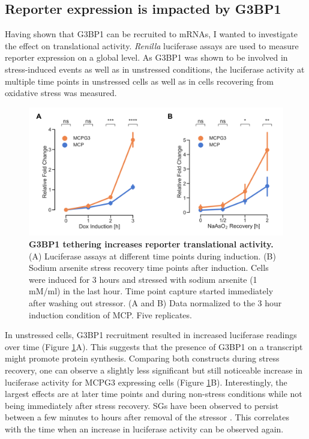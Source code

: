 \subsection{Reporter expression is impacted by G3BP1} \label{mcp_luciferase}

Having shown that G3BP1 can be recruited to mRNAs, I wanted to investigate the effect on translational activity. \textit{Renilla} luciferase assays are used to measure reporter expression on a global level.
As G3BP1 was shown to be involved in stress-induced events as well as in unstressed conditions, the luciferase activity at multiple time points in unstressed cells as well as in cells recovering from oxidative stress was measured.

\begin{figure}[t!]
    \centering
    \includegraphics[width=\linewidth]{images/figure3}
    \caption{\textbf{G3BP1 tethering increases reporter translational activity.}
        (A) Luciferase assays at different time points during induction.
        (B) Sodium arsenite stress recovery time points after induction.
            Cells were induced for 3 hours and stressed with sodium arsenite (1 mM/ml) in the last hour.
            Time point capture started immediately after washing out stressor.
        (A and B) Data normalized to the 3 hour induction condition of MCP. Five replicates.   
    }
    \label{fig:mcp_luciferase}
\end{figure}

In unstressed cells, G3BP1 recruitment resulted in increased luciferase readings over time (Figure \ref{fig:mcp_luciferase}A).
This suggests that the presence of G3BP1 on a transcript might promote protein synthesis.
Comparing both constructs during stress recovery, one can observe a slightly less significant but still noticeable increase in luciferase activity for MCPG3 expressing cells (Figure \ref{fig:mcp_luciferase}B).
Interestingly, the largest effects are at later time points and during non-stress conditions while not being immediately after stress recovery.
SGs have been observed to persist between a few minutes to hours after removal of the stressor \cite{chen_relationships_2017}.
This correlates with the time when an increase in luciferase activity can be observed again.


